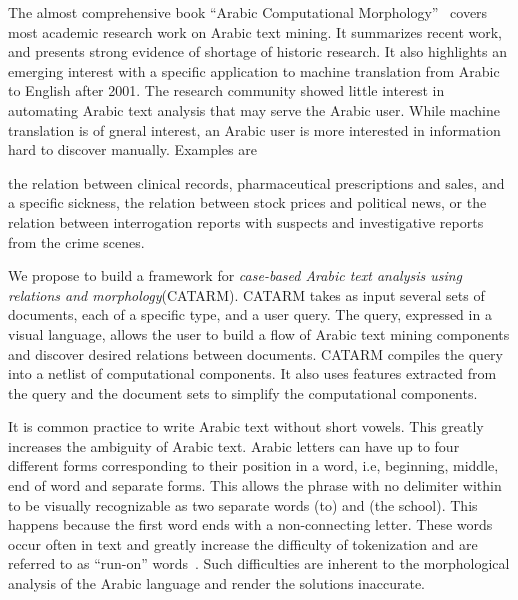 \documentclass[12pt]{article}
\newcommand{\noTrRL}[1]{\transfalse\RL{#1}\transtrue}
\begin{document}
The almost comprehensive book 
``Arabic Computational Morphology''~\cite{Sou07}
covers most academic research work on Arabic text mining.
It summarizes recent work, and presents strong evidence of 
shortage of historic research. It also highlights  an emerging 
interest with a specific application to machine 
translation from Arabic to English after 2001.
The research community showed little interest in 
automating Arabic text analysis that may serve
the Arabic user.
While machine translation is of gneral interest, 
an Arabic user is more interested in 
information hard to discover manually.
Examples are {the relation between clinical records, pharmaceutical 
prescriptions and sales, and a specific sickness,
the relation
between stock prices and political news, or the 
relation between interrogation reports with suspects
and investigative reports from the crime scenes. 

We propose to build a framework for
{\em case-based Arabic text analysis using relations and morphology}(CATARM). 
CATARM takes as input several sets of documents, each of a specific
type, and a user query. %
The query, expressed in a visual language, allows the user 
to build a flow of Arabic text mining
components and discover desired relations between documents. 
CATARM compiles the query into a netlist of computational 
components. It also uses features extracted from the query and 
the document sets to simplify the computational 
components. 

\novocalize
It is common practice to write Arabic text
without short vowels. 
This greatly increases the ambiguity of Arabic text. 
Arabic letters can have up to 
four different forms
corresponding to their position in a word, i.e, beginning,
middle, end of word and separate forms. 
This allows the phrase
\noTrRL{il_A\nospace almdrsT}  with no delimiter within
to be visually recognizable
as two separate words  (to) and  (the school).
This happens because the first word  ends with
 a non-connecting letter. 
These words occur often in text and greatly increase the
difficulty of tokenization and are referred to as 
``run-on'' words~\cite{Buckwalter:04}.
Such difficulties are inherent to the 
morphological analysis of the Arabic language and
render the solutions inaccurate.


}
\end{document}
